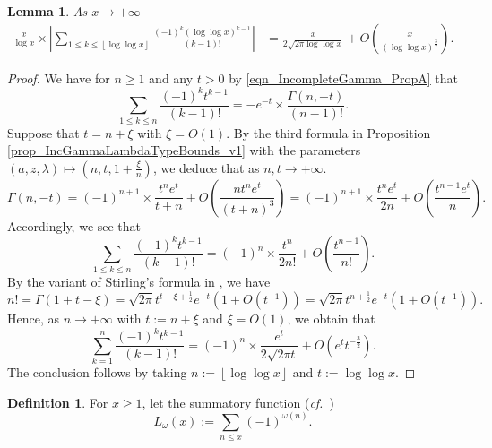 \documentclass[11pt,reqno,a4letter]{article}
\newcommand{\hlocalref}[1]{\hyperref[#1]{\ref{#1}}}
\numberwithin{equation}{section}
\numberwithin{figure}{section}
\numberwithin{table}{section}
\newcommand{\cf}{\textit{cf.\ }}
\newcommand{\floor}[1]{\left\lfloor #1 \right\rfloor}
\theoremstyle{plain}
\newtheorem{lemma}[theorem]{Lemma}
\numberwithin{theorem}{section}
\theoremstyle{definition}
\newtheorem{definition}[theorem]{Definition}
\begin{document}
\begin{lemma}
\label{lemma_ConvenientIncGammaFuncTypePartialSumAsymptotics_v2}
As $x \rightarrow +\infty$  
\begin{align*}
\frac{x}{\log x} \times \left\lvert \sum_{1 \leq k \leq \floor{\log\log x}} 
     \frac{(-1)^k (\log\log x)^{k-1}}{(k-1)!} \right\rvert 
     & = \frac{x}{2\sqrt{2\pi \log\log x}} + O\left(\frac{x}{(\log\log x)^{\frac{3}{2}}}\right). 
\end{align*}
\end{lemma}
\begin{proof}
We have for $n \geq 1$ and any $t > 0$ by 
\eqref{eqn_IncompleteGamma_PropA} that 
\[
\sum_{1 \leq k \leq n} \frac{(-1)^k t^{k-1}}{(k-1)!} = -e^{-t} \times 
     \frac{\Gamma(n, -t)}{(n-1)!}. 
\]
Suppose that $t = n + \xi$ with $\xi = O(1)$. 
By the third formula 
in Proposition \hlocalref{prop_IncGammaLambdaTypeBounds_v1} 
with the parameters $(a, z, \lambda) \mapsto \left(n, t, 1 + \frac{\xi}{n}\right)$, 
we deduce that as $n,t \rightarrow +\infty$. 
\begin{equation}
\label{eqn_ProofTag_lemma_ConvenientIncGammaFuncTypePartialSumAsymptotics_v2}
\Gamma(n, -t) = (-1)^{n+1} \times \frac{t^n e^{t}}{t+n} + 
     O\left(\frac{n t^n e^{t}}{(t+n)^3}\right) = 
     (-1)^{n+1} \times \frac{t^n e^t}{2n} + O\left(\frac{t^{n-1} e^t}{n}\right). 
\end{equation}
Accordingly, we see that 
\[
\sum_{1 \leq k \leq n} \frac{(-1)^k t^{k-1}}{(k-1)!} = 
     (-1)^{n} \times \frac{t^n}{2n!} + O\left(\frac{t^{n-1}}{n!}\right). 
\]
By the variant of Stirling's formula in \cite[\cf Eq.\ (5.11.8)]{NISTHB}, we have 
\[
n! = \Gamma(1 + t - \xi) = \sqrt{2\pi} t^{t-\xi+\frac{1}{2}} e^{-t} \left(1 + O\left(t^{-1}\right)\right) = 
     \sqrt{2\pi} t^{n+\frac{1}{2}} e^{-t} \left(1 + O\left(t^{-1}\right)\right). 
\]
Hence, as $n \rightarrow +\infty$ with $t := n + \xi$ and $\xi = O(1)$, we obtain that 
\[
\sum_{k=1}^{n} \frac{(-1)^k t^{k-1}}{(k-1)!} = (-1)^n \times \frac{e^t}{2 \sqrt{2\pi t}} + 
     O\left(e^t t^{-\frac{3}{2}}\right). 
\]
The conclusion follows by taking $n := \floor{\log\log x}$ and $t := \log\log x$. 
\end{proof}

\begin{definition}
For $x \geq 1$, let the summatory function (\cf \cite{LUNE-DRESSLER}) 
\[
L_{\omega}(x) := \sum_{n \leq x} (-1)^{\omega(n)}. 
\]
\end{definition}
\end{document}

